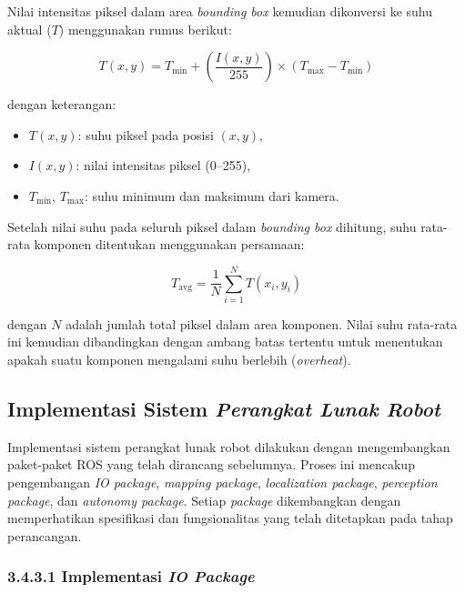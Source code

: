 Nilai intensitas piksel dalam area \emph{bounding box} kemudian dikonversi ke suhu aktual (\(T\)) menggunakan rumus berikut:

\begin{equation}
T(x, y) = T_{\text{min}} + \left( \frac{I(x, y)}{255} \right) \times (T_{\text{max}} - T_{\text{min}})
\label{eq:suhu-piksel}
\end{equation}


\newpage
dengan keterangan:
\begin{itemize}
  \item \( T(x, y) \): suhu piksel pada posisi \((x, y)\),
  \item \( I(x, y) \): nilai intensitas piksel (0–255),
  \item \( T_{\text{min}} \), \( T_{\text{max}} \): suhu minimum dan maksimum dari kamera.
\end{itemize}

Setelah nilai suhu pada seluruh piksel dalam \emph{bounding box} dihitung, suhu rata-rata komponen ditentukan menggunakan persamaan:

\begin{equation}
T_{\text{avg}} = \frac{1}{N} \sum_{i=1}^{N} T(x_i, y_i)
\label{eq:rata-rata-suhu}
\end{equation}

\noindent
dengan \( N \) adalah jumlah total piksel dalam area komponen. Nilai suhu rata-rata ini kemudian dibandingkan dengan ambang batas tertentu untuk menentukan apakah suatu komponen mengalami suhu berlebih (\emph{overheat}).

\subsection{Implementasi Sistem \emph{Perangkat Lunak Robot}}
Implementasi sistem perangkat lunak robot dilakukan dengan mengembangkan paket-paket ROS yang telah dirancang sebelumnya. Proses ini mencakup pengembangan \emph{IO package}, \emph{mapping package}, \emph{localization package}, \emph{perception package}, dan \emph{autonomy package}. Setiap \emph{package} dikembangkan dengan memperhatikan spesifikasi dan fungsionalitas yang telah ditetapkan pada tahap perancangan.

\subsubsection{3.4.3.1 Implementasi \emph{IO Package}}

